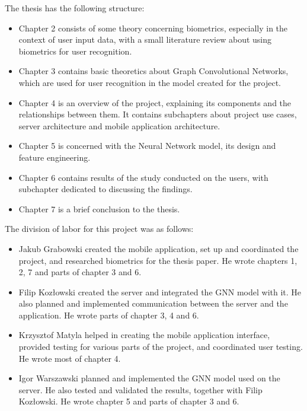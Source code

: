 The thesis has the following structure:
\begin{itemize}
    \item Chapter 2 consists of some theory concerning biometrics, especially in the context of user input data, with a small literature review about using biometrics for user recognition.
    \item Chapter 3 contains basic theoretics about Graph Convolutional Networks, which are used for user recognition in the model created for the project.
    \item Chapter 4 is an overview of the project, explaining its components and the relationships between them. It contains subchapters about project use cases, server architecture and mobile application architecture.
    \item Chapter 5 is concerned with the Neural Network model, its design and feature engineering.
    \item Chapter 6 contains results of the study conducted on the users, with subchapter dedicated to discussing the findings.
    \item Chapter 7 is a brief conclusion to the thesis.
\end{itemize}

The division of labor for this project was as follows:
\begin{itemize}
    \item Jakub Grabowski created the mobile application, set up and coordinated the project, and researched biometrics for the thesis paper. He wrote chapters 1, 2, 7 and parts of chapter 3 and 6.
    \item Filip Kozłowski created the server and integrated the GNN model with it. He also planned and implemented communication between the server and the application. He wrote parts of chapter 3, 4 and 6. 
    \item Krzysztof Matyla helped in creating the mobile application interface, provided testing for various parts of the project, and coordinated user testing. He wrote most of chapter 4.
    \item Igor Warszawski planned and implemented the GNN model used on the server. He also tested and validated the results, together with Filip Kozłowski. He wrote chapter 5 and parts of chapter 3 and 6.
\end{itemize}
